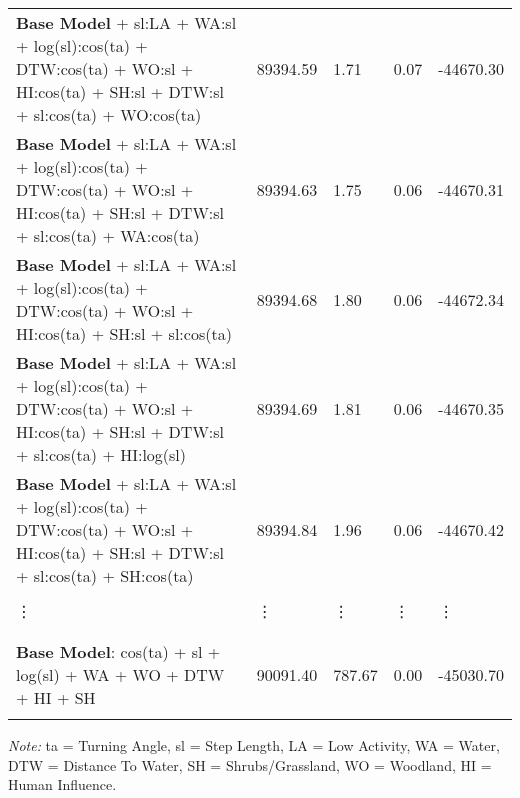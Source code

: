 \documentclass[abstract=off,10pt,a4paper,bibliography=totocnumbered]{article}
\begin{document}
\begin{table}[hbpt]
\begin{center}
{\begin{threeparttable}
\begin{tabular}{lllll}
          \textbf{Base Model} + sl:LA + WA:sl + log(sl):cos(ta) + DTW:cos(ta) + WO:sl + HI:cos(ta) + SH:sl + DTW:sl + sl:cos(ta) + WO:cos(ta) & 89394.59 & 1.71 & 0.07 & -44670.30 \\
          \textbf{Base Model} + sl:LA + WA:sl + log(sl):cos(ta) + DTW:cos(ta) + WO:sl + HI:cos(ta) + SH:sl + DTW:sl + sl:cos(ta) + WA:cos(ta) & 89394.63 & 1.75 & 0.06 & -44670.31 \\
          \textbf{Base Model} + sl:LA + WA:sl + log(sl):cos(ta) + DTW:cos(ta) + WO:sl + HI:cos(ta) + SH:sl + sl:cos(ta) & 89394.68 & 1.80 & 0.06 & -44672.34 \\
          \textbf{Base Model} + sl:LA + WA:sl + log(sl):cos(ta) + DTW:cos(ta) + WO:sl + HI:cos(ta) + SH:sl + DTW:sl + sl:cos(ta) + HI:log(sl) & 89394.69 & 1.81 & 0.06 & -44670.35 \\
          \textbf{Base Model} + sl:LA + WA:sl + log(sl):cos(ta) + DTW:cos(ta) + WO:sl + HI:cos(ta) + SH:sl + DTW:sl + sl:cos(ta) + SH:cos(ta) & 89394.84 & 1.96 & 0.06 & -44670.42 \\
          \hdashline
          \\
          \vdots & \vdots & \vdots & \vdots & \vdots \\
          \\
          \hdashline
          \\
          \textbf{Base Model}: cos(ta) + sl + log(sl) + WA + WO + DTW + HI + SH & 90091.40 & 787.67 & 0.00 & -45030.70\\
          \\
         \bottomrule
       \end{tabular}
       \begin{tablenotes}
         \item \textit{Note:} ta = Turning Angle, sl = Step Length, LA = Low Activity, WA = Water,
         DTW = Distance To Water, SH = Shrubs/Grassland, WO = Woodland, HI =
         Human Influence.
       \end{tablenotes}
     \end{threeparttable}
    }
  \end{center}
\end{table}

\end{document}
